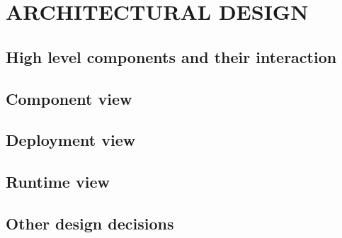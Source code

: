 \section{ARCHITECTURAL DESIGN}

	

	\subsection{High level components and their interaction}

	\subsection{Component view}

	\subsection{Deployment view}

	\subsection{Runtime view}

	
	\subsection{Other design decisions}
